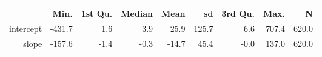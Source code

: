 \begin{table}[ht]
\centering
\begin{tabular}{rrrrrrrrr}
  \hline
 & Min. & 1st Qu. & Median & Mean & sd & 3rd Qu. & Max. & N \\ 
  \hline
intercept & -431.7 & 1.6 & 3.9 & 25.9 & 125.7 & 6.6 & 707.4 & 620.0 \\ 
  slope & -157.6 & -1.4 & -0.3 & -14.7 & 45.4 & -0.0 & 137.0 & 620.0 \\ 
   \hline
\end{tabular}
\end{table}

